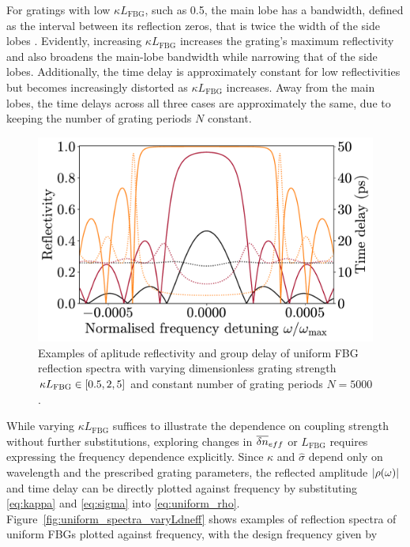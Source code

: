 For gratings with low $\kappa L_\text{FBG}$, such as 0.5, the main lobe has a bandwidth, defined as the interval between its reflection zeros, that is twice the width of the side lobes \cite{erdogan1997fibre}.
Evidently, increasing $\kappa L_\text{FBG}$ increases the grating's maximum reflectivity and also broadens the main-lobe bandwidth while narrowing that of the side lobes.
Additionally, the time delay is approximately constant for low reflectivities but becomes increasingly distorted as $\kappa L_\text{FBG}$ increases.
Away from the main lobes, the time delays across all three cases are approximately the same, due to keeping the number of grating periods $N$ constant.
%
\begin{figure}[!t]
    \includegraphics[width=\linewidth]{Images/Uniform_varying_kL_Rtau.pdf}
    \caption{Examples of aplitude reflectivity and group delay of uniform FBG reflection spectra with varying dimensionless grating strength $\kappa L_\text{FBG} \in [0.5, 2, 5]$ and constant number of grating periods $N=5000$.}
    \label{fig:uniform_spectra_varykL}
\end{figure}
%
\par
%
While varying $\kappa L_\text{FBG}$ suffices to illustrate the dependence on coupling strength without further substitutions, exploring changes in $\overline{\delta n}_{eff}$ or $L_\text{FBG}$ requires expressing the frequency dependence explicitly.
Since $\kappa$ and $\hat{\sigma}$ depend only on wavelength and the prescribed grating parameters, the reflected amplitude $|\rho(\omega)|$ and time delay can be directly plotted against frequency by substituting \eqref{eq:kappa} and \eqref{eq:sigma} into \eqref{eq:uniform_rho}.
Figure~\ref{fig:uniform_spectra_varyLdneff} shows examples of reflection spectra of uniform FBGs plotted against frequency, with the design frequency given by

